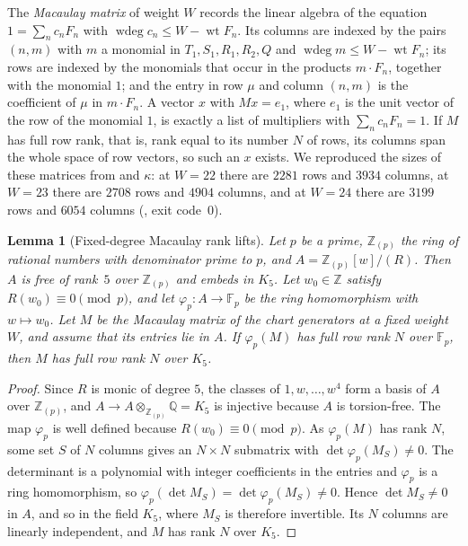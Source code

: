\documentclass[a4paper,11pt]{article}
\newcommand{\filename}[1]{\texttt{\seqsplit{#1}}}
\theoremstyle{jsplain}
\newtheorem{lemma}[theorem]{Lemma}
\theoremstyle{jsdef}
\theoremstyle{jsrem}
\begin{document}
The \emph{Macaulay matrix} of weight $W$ records the linear algebra of the equation $1=\sum_nc_nF_n$ with $\operatorname{wdeg}c_n\le W-\operatorname{wt}F_n$. Its columns are indexed by the pairs $(n,m)$ with $m$ a monomial in $T_1,S_1,R_1,R_2,Q$ and $\operatorname{wdeg}m\le W-\operatorname{wt}F_n$; its rows are indexed by the monomials that occur in the products $m\cdot F_n$, together with the monomial $1$; and the entry in row $\mu$ and column $(n,m)$ is the coefficient of $\mu$ in $m\cdot F_n$. A vector $x$ with $Mx=e_1$, where $e_1$ is the unit vector of the row of the monomial $1$, is exactly a list of multipliers with $\sum_nc_nF_n=1$. If $M$ has full row rank, that is, rank equal to its number $N$ of rows, its columns span the whole space of row vectors, so such an $x$ exists. We reproduced the sizes of these matrices from \filename{conds\_c.json} and $\kappa$: at $W=22$ there are $2281$ rows and $3934$ columns, at $W=23$ there are $2708$ rows and $4904$ columns, and at $W=24$ there are $3199$ rows and $6054$ columns (\filename{c2\_k5\_chart\_macaulay.py}, exit code~$0$).

\begin{lemma}[Fixed-degree Macaulay rank lifts]\label{bc:lem:rank}
Let $p$ be a prime, $\mathbb{Z}_{(p)}$ the ring of rational numbers with denominator prime to $p$, and $A=\mathbb{Z}_{(p)}[w]/(R)$. Then $A$ is free of rank~$5$ over $\mathbb{Z}_{(p)}$ and embeds in $K_5$. Let $w_0\in\mathbb{Z}$ satisfy $R(w_0)\equiv0\pmod p$, and let $\varphi_p:A\to\mathbb{F}_p$ be the ring homomorphism with $w\mapsto w_0$. Let $M$ be the Macaulay matrix of the chart generators at a fixed weight $W$, and assume that its entries lie in $A$. If $\varphi_p(M)$ has full row rank $N$ over $\mathbb{F}_p$, then $M$ has full row rank $N$ over $K_5$.
\end{lemma}

\begin{proof}
Since $R$ is monic of degree $5$, the classes of $1,w,\dots,w^4$ form a basis of $A$ over $\mathbb{Z}_{(p)}$, and $A\to A\otimes_{\mathbb{Z}_{(p)}}\mathbb{Q}=K_5$ is injective because $A$ is torsion-free. The map $\varphi_p$ is well defined because $R(w_0)\equiv0\pmod p$. As $\varphi_p(M)$ has rank $N$, some set $S$ of $N$ columns gives an $N\times N$ submatrix with $\det\varphi_p(M_S)\neq0$. The determinant is a polynomial with integer coefficients in the entries and $\varphi_p$ is a ring homomorphism, so $\varphi_p(\det M_S)=\det\varphi_p(M_S)\neq0$. Hence $\det M_S\neq0$ in $A$, and so in the field $K_5$, where $M_S$ is therefore invertible. Its $N$ columns are linearly independent, and $M$ has rank $N$ over $K_5$.
\end{proof}
\end{document}
